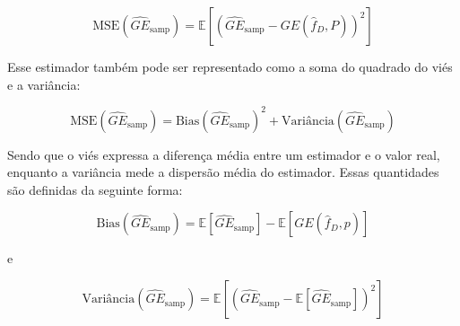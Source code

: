 \documentclass[
  12pt,
  oneside,
  a4paper,
  chapter=TITLE,
  section=TITLE,
  brazil]{abntex2}
\begin{document}
\[\text{MSE}(\widehat{GE}_\text{samp}) = \mathbb{E}[(\widehat{GE}_\text{samp} - GE(\hat{f}_D, P))^2]\]

Esse estimador também pode ser representado como a soma do quadrado do
viés e a variância:

\[\text{MSE}(\widehat{GE}_\text{samp}) = \text{Bias}(\widehat{GE}_\text{samp})^2 + \text{Variância}(\widehat{GE}_\text{samp})\]

Sendo que o viés expressa a diferença média entre um estimador e o valor
real, enquanto a variância mede a dispersão média do estimador. Essas
quantidades são definidas da seguinte forma:

\[\text{Bias}(\widehat{GE}_\text{samp}) = \mathbb{E}[\widehat{GE}_\text{samp}] - \mathbb{E}[GE(\hat{f}_D, p)]\]

e

\[\text{Variância}(\widehat{GE}_\text{samp}) = \mathbb{E}[(\widehat{GE}_\text{samp} - \mathbb{E}[\widehat{GE}_\text{samp}])^2]\]


\printbibliography


\postextual

%
%
%
%
%
%
%
%
%
%
%

\printindex
\end{document}
